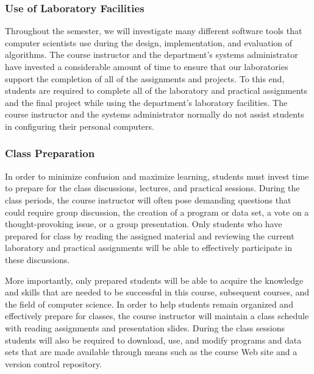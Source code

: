 \subsubsection*{Use of Laboratory Facilities}

Throughout the semester, we will investigate many different software tools that computer scientists use during the
design, implementation, and evaluation of algorithms.  The course instructor and the department's systems administrator
have invested a considerable amount of time to ensure that our laboratories support the completion of all of the
assignments and projects.  To this end, students are required to complete all of the laboratory and practical
assignments and the final project while using the department's laboratory facilities. The course instructor and the
systems administrator normally do not assist students in configuring their personal computers.

\subsubsection*{Class Preparation}


In order to minimize confusion and maximize learning, students must invest time to prepare for the class discussions,
lectures, and practical sessions.  During the class periods, the course instructor will often pose demanding questions
that could require group discussion, the creation of a program or data set, a vote on a thought-provoking issue, or a
group presentation.  Only students who have prepared for class by reading the assigned material and reviewing the
current laboratory and practical assignments will be able to effectively participate in these discussions.

More importantly, only prepared students will be able to acquire the knowledge and skills that are needed to be
successful in this course, subsequent courses, and the field of computer science.  In order to help students remain
organized and effectively prepare for classes, the course instructor will maintain a class schedule with reading
assignments and presentation slides.   During the class sessions students will also be required to download, use, and
modify programs and data sets that are made available through means such as the course Web site and a version control
repository.

